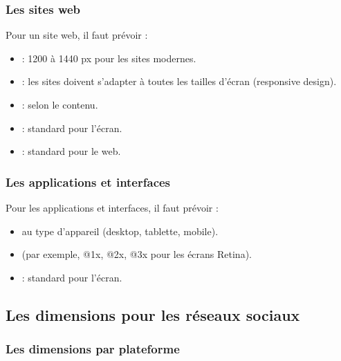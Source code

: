 \subsubsection{Les sites web}

Pour un site web, il faut prévoir :

\begin{itemize}
    \item {} : 1200 à 1440 px pour les sites modernes.
    \item {} : les sites doivent s'adapter à toutes les tailles d'écran (responsive design).
    \item {} : selon le contenu.
    \item {} : standard pour l'écran.
    \item {} : standard pour le web.
\end{itemize}

\subsubsection{Les applications et interfaces}

Pour les applications et interfaces, il faut prévoir :

\begin{itemize}
    \item {} au type d'appareil (desktop, tablette, mobile).
    \item {} (par exemple, @1x, @2x, @3x pour les écrans Retina).
    \item {} : standard pour l'écran.
\end{itemize}

\subsection{Les dimensions pour les réseaux sociaux}

\subsubsection{Les dimensions par plateforme}

